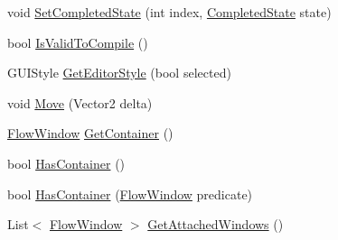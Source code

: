 \begin{DoxyCompactItemize}
\item 
void \hyperlink{class_unity_engine_1_1_u_i_1_1_windows_1_1_plugins_1_1_flow_1_1_flow_window_a211b838690b4aa5d9d8f89e727caa100}{Set\+Completed\+State} (int index, \hyperlink{namespace_unity_engine_1_1_u_i_1_1_windows_1_1_plugins_1_1_flow_a4525a1ea5727aeeef99ada173b0bd2b2}{Completed\+State} state)
\item 
bool \hyperlink{class_unity_engine_1_1_u_i_1_1_windows_1_1_plugins_1_1_flow_1_1_flow_window_a6db7d0428fe45d9bfccfd3eded78f6d9}{Is\+Valid\+To\+Compile} ()
\item 
G\+U\+I\+Style \hyperlink{class_unity_engine_1_1_u_i_1_1_windows_1_1_plugins_1_1_flow_1_1_flow_window_adaff0fc00efc85d4011869f04417d47d}{Get\+Editor\+Style} (bool selected)
\item 
void \hyperlink{class_unity_engine_1_1_u_i_1_1_windows_1_1_plugins_1_1_flow_1_1_flow_window_a6cf15623f024220e619c7947af850644}{Move} (Vector2 delta)
\item 
\hyperlink{class_unity_engine_1_1_u_i_1_1_windows_1_1_plugins_1_1_flow_1_1_flow_window}{Flow\+Window} \hyperlink{class_unity_engine_1_1_u_i_1_1_windows_1_1_plugins_1_1_flow_1_1_flow_window_af0cb878b2d86ddf34f876455dc5486d6}{Get\+Container} ()
\item 
bool \hyperlink{class_unity_engine_1_1_u_i_1_1_windows_1_1_plugins_1_1_flow_1_1_flow_window_ad4f26422d47d3fcf0f0d67c90bf1ff13}{Has\+Container} ()
\item 
bool \hyperlink{class_unity_engine_1_1_u_i_1_1_windows_1_1_plugins_1_1_flow_1_1_flow_window_a5f73042d9de5c2a1703d62b2acc8afaa}{Has\+Container} (\hyperlink{class_unity_engine_1_1_u_i_1_1_windows_1_1_plugins_1_1_flow_1_1_flow_window}{Flow\+Window} predicate)
\item 
List$<$ \hyperlink{class_unity_engine_1_1_u_i_1_1_windows_1_1_plugins_1_1_flow_1_1_flow_window}{Flow\+Window} $>$ \hyperlink{class_unity_engine_1_1_u_i_1_1_windows_1_1_plugins_1_1_flow_1_1_flow_window_a7f5dc0816a3c486d5e66cf6c1aa3cd93}{Get\+Attached\+Windows} ()
\end{DoxyCompactItemize}
